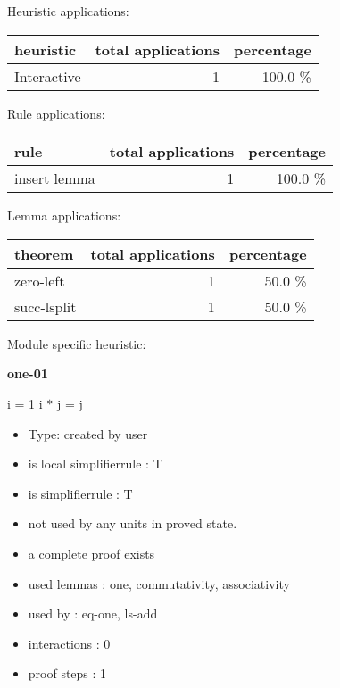 \documentclass[a4paper]{article}
\begin{document}
\medskip


Heuristic applications:

\begin{supertabular}{l|r|r}
heuristic	& total applications & percentage \\ \hline
Interactive & 1 & 100.0 \% \\

\end{supertabular}

Rule applications:

\begin{supertabular}{l|r|r}
rule	        & total applications & percentage \\ \hline
insert lemma & 1 & 100.0 \% \\

\end{supertabular}

Lemma applications:

\begin{supertabular}{l|r|r}
theorem	        & total applications & percentage \\ \hline
zero-left & 1 & 50.0 \% \\
succ-lsplit & 1 & 50.0 \% \\

\end{supertabular}

Module specific heuristic:

\pagebreak

{\LARGE\bf one-01}\label{lemma-one-01}

\medskip

 \Fol i = 1 \Imp i $*$ j = j

\begin{itemize}

\item Type: created by user

\item is local simplifierrule : T
\item is simplifierrule : T
\item not used by any units in proved state.
\item       a complete proof exists
\item       used lemmas  : one, commutativity, associativity
\item       used by      : eq-one, ls-add
\item       interactions : 0
\item       proof steps  : 1
\end{itemize}
\end{document}
